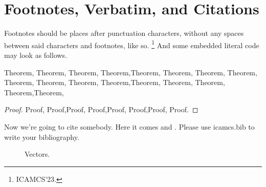 \documentclass[11pt]{article}
\begin{document}
	\section{Footnotes, Verbatim, and Citations}
	
	Footnotes should be places after punctuation characters, without any
	spaces between said characters and footnotes, like so.%
	\footnote{ICAMCS'23.} And some embedded literal code may
	look as follows.
	\begin{theorem}
	Theorem, Theorem, Theorem, Theorem,Theorem, Theorem, Theorem, Theorem, Theorem, Theorem, Theorem, Theorem,Theorem, Theorem, Theorem, Theorem,Theorem, 
	\end{theorem}
\begin{proof}
Proof, Proof,Proof, Proof,Proof, Proof,Proof, Proof.
\end{proof}	
	Now we're going to cite somebody. Here it comes \cite{AB:2023} and \cite{ABC:2024}. Please use icamcs.bib to write your bibliography. %
	

	
	
	
	
	
	\begin{figure}
		\begin{center}
		\end{center}
		\caption{\label{fig:vectors}  Vectors. }
	\end{figure}

    
	
		
\end{document}
